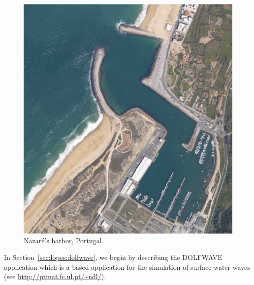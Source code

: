 \begin{figure}
  \begin{center}
    \includegraphics[width=\smallfig]{chapters/lopes/pdf/nazare1.pdf}
  \end{center}
  \caption{Nazar\'{e}'s harbor, Portugal.}
  \label{fig:lopes:harbor}
\end{figure}

In Section~\ref{sec:lopes:dolfwave}, we begin by describing the
DOLFWAVE application which is a \fenics based application for the
simulation of surface water waves (see
\url{http://ptmat.fc.ul.pt/~ndl/}).



